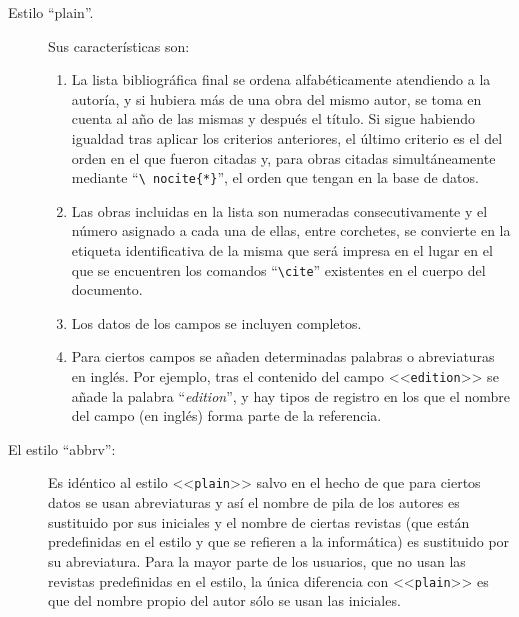 \documentclass[a4paper,11pt]{article}
\def\ltr#1-{<<\texttt{#1}>>}
\def\cmd#1-{``\texttt{\textbackslash#1}''}
\begin{document}
\begin{description}

\item[Estilo ``plain''.] Sus características son:

  \begin{enumerate}

  \item La lista bibliográfica final se ordena alfabéticamente atendiendo a la
    autoría, y si hubiera  más de una obra del mismo autor,  se toma en cuenta
    al año de las mismas y  después el título. Si sigue habiendo igualdad tras
    aplicar los criterios anteriores, el último criterio es el del orden en el
    que  fueron citadas y,  para obras  citadas simultáneamente  mediante \cmd
    nocite\{*\}-, el orden que tengan en la base de datos.

  \item Las  obras incluidas en la  lista son numeradas  consecutivamente y el
    número asignado a  cada una de ellas, entre corchetes,  se convierte en la
    etiqueta identificativa de la misma que será impresa en el lugar en el que
    se  encuentren  los  comandos  \cmd  cite- existentes  en  el  cuerpo  del
    documento.

  \item Los datos de los campos se incluyen completos.

  \item Para ciertos campos se  añaden determinadas palabras o abreviaturas en
    inglés.  Por ejemplo,  tras el contenido del campo  \ltr edition- se añade
    la  palabra ``\emph{edition}'',  y hay  tipos de  registro en  los  que el
    nombre del campo (en inglés) forma parte de la referencia.

  \end{enumerate}

\item[El  estilo ``abbrv'':] Es  idéntico al  estilo \ltr  plain- salvo  en el
  hecho de que para ciertos datos se usan abreviaturas y así el nombre de pila
  de  los autores  es sustituido  por  sus iniciales  y el  nombre de  ciertas
  revistas  (que están  predefinidas  en el  estilo  y que  se  refieren a  la
  informática) es sustituido  por su abreviatura.  Para la  mayor parte de los
  usuarios,  que no  usan las  revistas predefinidas  en el  estilo,  la única
  diferencia con \ltr  plain- es que del nombre propio del  autor sólo se usan
  las iniciales.


\end{description}
\end{document}
